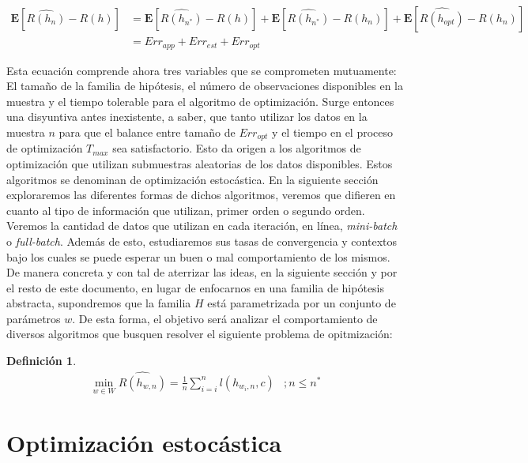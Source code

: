 \documentclass{book}
\theoremstyle{plain}
\theoremstyle{definition}
\newtheorem{defn}{Definición}[section]
\theoremstyle{remark}
\begin{document}
\begin{equation*}
  \begin{split}
    \mathbf{E}[\hat{R(h_{n})} - R(h)] & = \mathbf{E}[\hat{R(h_{n^{*}})} - R(h)] + \mathbf{E}[\hat{R(h_{n^{*}})} - R(h_n)] +  \mathbf{E}[\hat{R(h_{opt})} - R(h_n)]\\
                                     & = Err_{app} + Err_{est} + Err_{opt}
  \end{split}
\end{equation*}

Esta ecuación comprende ahora tres variables que se comprometen mutuamente: El tamaño de la familia de hipótesis, el número de observaciones disponibles en la muestra y el tiempo tolerable para el algoritmo de optimización. Surge entonces una disyuntiva antes inexistente, a saber, que tanto utilizar los datos en la muestra $n$ para que el balance entre tamaño de $Err_{opt}$ y el tiempo en el proceso de optimización $T_{max}$ sea satisfactorio. Esto da origen a los algoritmos de optimización que utilizan submuestras aleatorias de los datos disponibles. Estos algoritmos se denominan de optimización estocástica. En la siguiente sección exploraremos las diferentes formas de dichos algoritmos, veremos que difieren en cuanto al tipo de información que utilizan, primer orden o segundo orden. Veremos la cantidad de datos que utilizan en cada iteración, en línea, \emph{mini-batch} o \emph{full-batch}. Además de esto, estudiaremos sus tasas de convergencia y contextos bajo los cuales se puede esperar un buen o mal comportamiento de los mismos. De manera concreta y con tal de aterrizar las ideas, en la siguiente sección y por el resto de este documento, en lugar de enfocarnos en una familia de hipótesis abstracta, supondremos que la familia $H$ está parametrizada por un conjunto de parámetros $w$. De esta forma, el objetivo será analizar el comportamiento de diversos algoritmos que busquen resolver el siguiente problema de opitmización:

\begin{defn}\label{eq:central_prob}
\begin{equation*}
\begin{split}
\displaystyle\min_{w\in W}\hat{R(h_{w,n})}=\frac{1}{n}\displaystyle\sum_{i=i}^n l(h_{w_i,n},c) &; n\leq n^{*}
\end{split}
\end{equation*}

\end{defn}

\chapter{Optimización estocástica}
\end{document}
